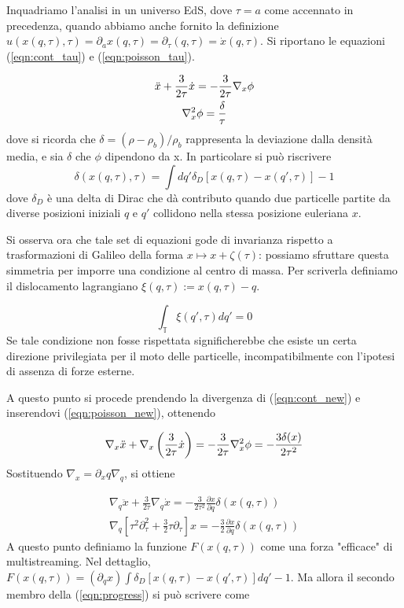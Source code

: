 Inquadriamo l'analisi in un universo EdS, dove $\tau = a$ come accennato in precedenza, quando abbiamo anche
fornito la definizione $u(x(q, \tau), \tau) = \partial_a x(q, \tau) = \partial_{\tau}(q, \tau) = \dot{x}(q, \tau)$.
Si riportano le equazioni (\ref{eqn:cont_tau}) e (\ref{eqn:poisson_tau}).

\begin{gather}
    \label{eqn:cont_new}
    \ddot{x} + \frac{3}{2\tau}\dot{x} = - \frac{3}{2\tau}\nabla_x \phi \\
    \label{eqn:poisson_new}
    \laplacian_x\phi = \frac{\delta}{\tau}
\end{gather}
dove si ricorda che $\delta = (\rho - \rho_b)/\rho_b$ rappresenta la deviazione dalla densità media, e sia $\delta$
che $\phi$ dipendono da x. In particolare si può riscrivere 
\begin{equation}
    \label{eqn:density}
    \delta(x(q, \tau), \tau) = \int dq' \delta_D[x(q, \tau)-x(q', \tau)] - 1
\end{equation}
dove $\delta_D$ è una delta di Dirac che dà contributo quando due particelle partite da diverse
posizioni iniziali $q$ e $q'$ collidono nella stessa posizione euleriana $x$.

Si osserva ora che tale set di equazioni gode di invarianza rispetto a trasformazioni di 
Galileo della forma $x \mapsto x + \zeta(\tau)$: possiamo sfruttare questa 
simmetria per imporre una condizione al centro di massa. Per scriverla definiamo il dislocamento
lagrangiano $\xi(q, \tau):= x(q, \tau) - q$.

\begin{equation}
    \label{eqn:com}
    \int_{\mathbb{T}}\xi(q', \tau) dq' = 0
\end{equation}
Se tale condizione non fosse rispettata significherebbe che esiste un certa direzione
privilegiata per il moto delle particelle, incompatibilmente con l'ipotesi di assenza di forze esterne.

A questo punto si procede prendendo la divergenza di (\ref{eqn:cont_new}) e inserendovi 
(\ref{eqn:poisson_new}), ottenendo

\begin{equation}
    \nabla_x \ddot{x} + \nabla_x \left(\frac{3}{2\tau}\dot{x}\right) = -\frac{3}{2\tau}\laplacian_x\phi = -\frac{3\delta(x)}{2\tau^2}
\end{equation}
Sostituendo $\nabla_x = \partial_x q \nabla_q$, si ottiene

\begin{gather}
    \nabla_q \ddot{x} + \frac{3}{2\tau} \nabla_q\dot{x} = -\frac{3}{2\tau^2}\frac{\partial x}{\partial q}\delta(x(q,\tau)) \\
    \label{eqn:progress}
    \nabla_q \left[ \tau^2 \partial^2_{\tau} + \frac{3}{2}\tau \partial_{\tau} \right] x = -\frac{3}{2}\frac{\partial x}{\partial q}\delta(x(q,\tau))
\end{gather}
A questo punto definiamo la funzione $F(x(q, \tau))$ come una forza "efficace" di multistreaming. Nel dettaglio, $F(x(q, \tau)) = (\partial_q x) \int \delta_D[x(q, \tau)-x(q', \tau)]dq' -1$.
Ma allora il secondo membro della (\ref{eqn:progress}) si può scrivere come

